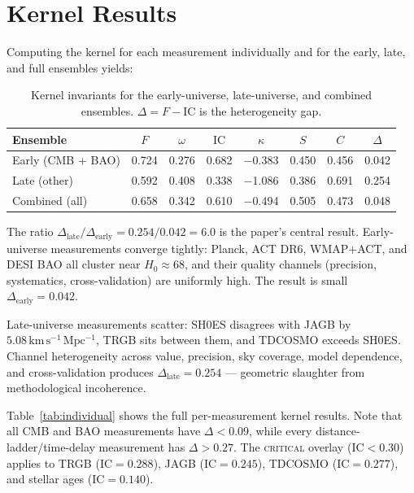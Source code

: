 \documentclass[
  aps,
  prd,
  twocolumn,
  superscriptaddress,
  nofootinbib,
  floatfix
]{revtex4-2}
\newcommand{\regime}[1]{\textrm{\upshape\scshape#1}}
\newcommand{\IC}{\mathrm{IC}}
\newcommand{\hetgap}{\Delta}
\newcommand{\Fid}{F}
\newcommand{\Drft}{\omega}
\newcommand{\Ent}{S}
\newcommand{\Curv}{C}
\newcommand{\Logint}{\kappa}
\begin{document}
\section{Kernel Results}\label{sec:results}

Computing the kernel for each measurement individually and for
the early, late, and full ensembles yields:

\begin{table}[h]
\caption{\label{tab:kernels}Kernel invariants for the
early-universe, late-universe, and combined ensembles.
$\hetgap = \Fid - \IC$ is the heterogeneity gap.}
\begin{ruledtabular}
\begin{tabular}{lccccccc}
Ensemble & $\Fid$ & $\Drft$ & $\IC$ & $\Logint$ & $\Ent$ & $\Curv$ & $\hetgap$ \\
\hline
Early (CMB + BAO) & 0.724 & 0.276 & 0.682 & $-$0.383 & 0.450 & 0.456 & 0.042 \\
Late (other) & 0.592 & 0.408 & 0.338 & $-$1.086 & 0.386 & 0.691 & 0.254 \\
Combined (all) & 0.658 & 0.342 & 0.610 & $-$0.494 & 0.505 & 0.473 & 0.048 \\
\end{tabular}
\end{ruledtabular}
\end{table}

The ratio $\hetgap_{\mathrm{late}}/\hetgap_{\mathrm{early}} = 0.254/0.042 = 6.0$ is the paper's central result.
Early-universe measurements converge tightly: Planck, ACT DR6,
WMAP+ACT, and DESI BAO all cluster near $H_0 \approx 68$, and
their quality channels (precision, systematics, cross-validation)
are uniformly high.
The result is small $\hetgap_{\mathrm{early}} = 0.042$.

Late-universe measurements scatter: SH0ES disagrees with JAGB by
$5.08\,\mathrm{km\,s^{-1}\,Mpc^{-1}}$, TRGB sits between them,
and TDCOSMO exceeds SH0ES.
Channel heterogeneity across value, precision, sky coverage,
model dependence, and cross-validation produces
$\hetgap_{\mathrm{late}} = 0.254$ --- geometric slaughter
from methodological incoherence.

Table~\ref{tab:individual} shows the full per-measurement
kernel results. Note that all CMB and BAO measurements have
$\hetgap < 0.09$, while every distance-ladder/time-delay
measurement has $\hetgap > 0.27$.
The \regime{critical} overlay ($\IC < 0.30$) applies to
TRGB ($\IC = 0.288$), JAGB ($\IC = 0.245$), TDCOSMO
($\IC = 0.277$), and stellar ages ($\IC = 0.140$).
\end{document}

